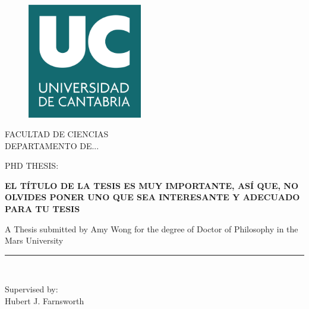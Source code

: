 \documentclass[a4paper,12pt, twoside, openright,makeidx]{book}
\title{\titulo}
\author{\autor}
\begin{document}
\begin{titlepage}

\begin{center}
\vspace*{-1in}
\begin{figure}[htb]
\begin{center}
\includegraphics[width=5cm]{./img/unicanLogo}
\end{center}
\end{figure}

FACULTAD DE CIENCIAS\\
\vspace*{0.15in}
DEPARTAMENTO DE... \\
\vspace*{0.6in}
\begin{large}
PHD THESIS:\\
\end{large}
\vspace*{0.2in}
\begin{Large}
\textbf{EL TÍTULO DE LA TESIS ES MUY IMPORTANTE, ASÍ QUE, NO OLVIDES PONER UNO QUE SEA INTERESANTE Y ADECUADO PARA TU TESIS} \\
\end{Large}
\vspace*{0.3in}
\begin{large}
A Thesis submitted by Amy Wong for the degree of Doctor of Philosophy in the Mars University\\
\end{large}
\vspace*{0.3in}
\rule{80mm}{0.1mm}\\
\vspace*{0.1in}
\begin{large}
  \begin{flushleft}
Supervised by: \\
Hubert J. Farnsworth \\
\end{flushleft}

\end{large}
\end{center}

\end{titlepage}
\end{document}
